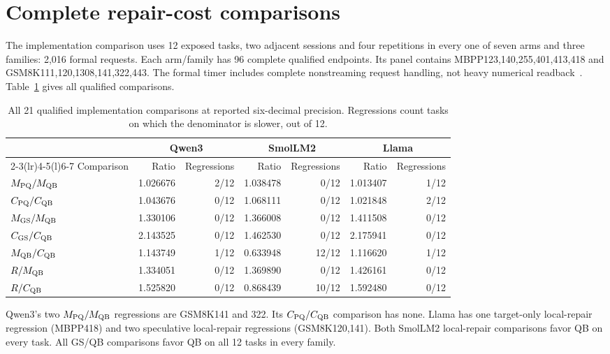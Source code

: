 \section{Complete repair-cost comparisons}
\label{supp:cost}
The implementation comparison uses 12 exposed tasks, two adjacent sessions and four repetitions in every one of seven arms and three families: 2,016 formal requests. Each arm/family has 96 complete qualified endpoints. Its panel contains MBPP123,140,255,401,413,418 and GSM8K111,120,1308,141,322,443. The formal timer includes complete nonstreaming request handling, not heavy numerical readback~\cite{rtxrepair}. Table~\ref{tab:allrepair} gives all qualified comparisons.

\begin{table}[t]\centering\small
\caption{All 21 qualified implementation comparisons at reported six-decimal precision. Regressions count tasks on which the denominator is slower, out of 12.}\label{tab:allrepair}
\begin{tabular}{@{}lrrrrrr@{}}\toprule
&\multicolumn{2}{c}{Qwen3}&\multicolumn{2}{c}{SmolLM2}&\multicolumn{2}{c}{Llama}\\
\cmidrule(lr){2-3}\cmidrule(lr){4-5}\cmidrule(l){6-7}
Comparison&Ratio&Regressions&Ratio&Regressions&Ratio&Regressions\\\midrule
$M_{\mathrm{PQ}}/M_{\mathrm{QB}}$ & 1.026676 & 2/12 & 1.038478 & 0/12 & 1.013407 & 1/12\\
$C_{\mathrm{PQ}}/C_{\mathrm{QB}}$ & 1.043676 & 0/12 & 1.068111 & 0/12 & 1.021848 & 2/12\\
$M_{\mathrm{GS}}/M_{\mathrm{QB}}$ & 1.330106 & 0/12 & 1.366008 & 0/12 & 1.411508 & 0/12\\
$C_{\mathrm{GS}}/C_{\mathrm{QB}}$ & 2.143525 & 0/12 & 1.462530 & 0/12 & 2.175941 & 0/12\\
$M_{\mathrm{QB}}/C_{\mathrm{QB}}$ & 1.143749 & 1/12 & 0.633948 & 12/12 & 1.116620 & 1/12\\
$R/M_{\mathrm{QB}}$ & 1.334051 & 0/12 & 1.369890 & 0/12 & 1.426161 & 0/12\\
$R/C_{\mathrm{QB}}$ & 1.525820 & 0/12 & 0.868439 & 10/12 & 1.592480 & 0/12\\
\bottomrule\end{tabular}
\end{table}

Qwen3's two $M_{\mathrm{PQ}}/M_{\mathrm{QB}}$ regressions are GSM8K141 and 322. Its $C_{\mathrm{PQ}}/C_{\mathrm{QB}}$ comparison has none. Llama has one target-only local-repair regression (MBPP418) and two speculative local-repair regressions (GSM8K120,141). Both SmolLM2 local-repair comparisons favor QB on every task. All GS/QB comparisons favor QB on all 12 tasks in every family.

